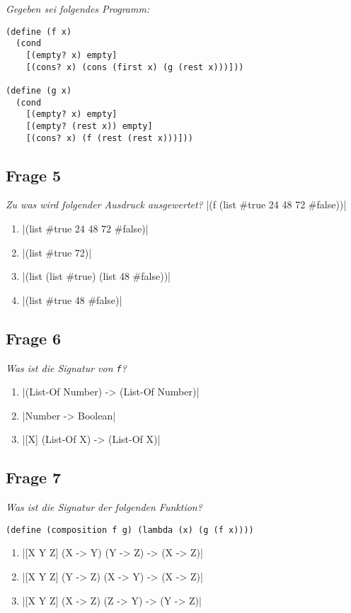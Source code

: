 \documentclass[a4paper, 11pt]{article}
\begin{document}
\begin{mdframed}
	\noindent\textit{Gegeben sei folgendes Programm:}
	\begin{verbatim}
(define (f x)
  (cond
    [(empty? x) empty]
    [(cons? x) (cons (first x) (g (rest x)))]))

(define (g x)
  (cond
    [(empty? x) empty]
    [(empty? (rest x)) empty]
    [(cons? x) (f (rest (rest x)))]))
\end{verbatim}

	\subsection*{Frage 5}
	\textit{Zu was wird folgender Ausdruck ausgewertet?}
	|(f (list #true 24 48 72 #false))|
	\begin{enumerate}[label=$\square$]
		\item {}|(list #true 24 48 72 #false)|
		\item {}|(list #true 72)|
		\item {}|(list (list #true) (list 48 #false))|
		\item {}|(list #true 48 #false)|
	\end{enumerate}

	\subsection*{Frage 6}
	\textit{Was ist die Signatur von \texttt{f}?}
	\begin{enumerate}[label=$\square$]
		\item {}|(List-Of Number) -> (List-Of Number)|
		\item {}|Number -> Boolean|
		\item {}|[X] (List-Of X) -> (List-Of X)|
	\end{enumerate}
\end{mdframed}

\subsection*{Frage 7}
\textit{Was ist die Signatur der folgenden Funktion?}
\begin{verbatim}
(define (composition f g) (lambda (x) (g (f x))))
\end{verbatim}
\begin{enumerate}[label=$\square$]
	\item {}|[X Y Z] (X -> Y) (Y -> Z) -> (X -> Z)|
	\item {}|[X Y Z] (Y -> Z) (X -> Y) -> (X -> Z)|
	\item {}|[X Y Z] (X -> Z) (Z -> Y) -> (Y -> Z)|
\end{enumerate}
\end{document}
